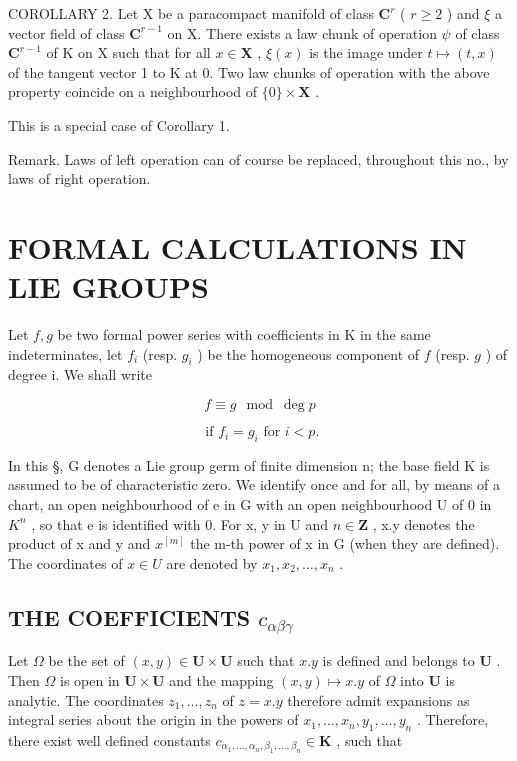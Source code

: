 COROLLARY 2. Let X be a paracompact manifold of class \(\mathbf{C}^r\) ( \(r \geqslant 2\) ) and \(\xi\) a vector field of class \(\mathbf{C}^{r-1}\) on X. There exists a law chunk of operation \(\psi\) of class \(\mathbf{C}^{r-1}\) of K on X such that for all \(x \in \mathbf{X}\) , \(\xi(x)\) is the image under \(t \mapsto (t, x)\) of the tangent vector 1 to K at 0. Two law chunks of operation with the above property coincide on a neighbourhood of \(\{0\} \times \mathbf{X}\) .

This is a special case of Corollary 1.

Remark. Laws of left operation can of course be replaced, throughout this no., by laws of right operation.

\section{FORMAL CALCULATIONS IN LIE GROUPS}

Let \(f, g\) be two formal power series with coefficients in K in the same indeterminates, let \(f_i\) (resp. \(g_i\) ) be the homogeneous component of \(f\) (resp. \(g\) ) of degree i. We shall write

\[
f \equiv g \mod \deg p
\]

\[
\text { if } f _ {i} = g _ {i} \text { for } i <   p.
\]

In this §, G denotes a Lie group germ of finite dimension n; the base field K is assumed to be of characteristic zero. We identify once and for all, by means of a chart, an open neighbourhood of e in G with an open neighbourhood U of 0 in \(K^{n}\) , so that e is identified with 0. For x, y in U and \(n \in \mathbf{Z}\) , x.y denotes the product of x and y and \(x^{[m]}\) the m-th power of x in G (when they are defined). The coordinates of \(x \in U\) are denoted by \(x_{1}, x_{2}, \ldots, x_{n}\) .

\subsection{\texorpdfstring{THE COEFFICIENTS \(c_{\alpha\beta\gamma}\)}{THE COEFFICIENTS c\_\{\textbackslash alpha\textbackslash beta\textbackslash gamma\}}}

Let \(\Omega\) be the set of \((x,y)\in\mathbf{U}\times\mathbf{U}\) such that \(x.y\) is defined and belongs to \(\mathbf{U}\) . Then \(\Omega\) is open in \(\mathbf{U}\times\mathbf{U}\) and the mapping \((x,y)\mapsto x.y\) of \(\Omega\) into \(\mathbf{U}\) is analytic. The coordinates \(z_{1},\ldots,z_{n}\) of \(z=x.y\) therefore admit expansions as integral series about the origin in the powers of \(x_{1},\ldots,x_{n},y_{1},\ldots,y_{n}\) . Therefore, there exist well defined constants \(c_{\alpha_{1},\ldots,\alpha_{n},\beta_{1},\ldots,\beta_{n}}\in\mathbf{K}\) , such that

